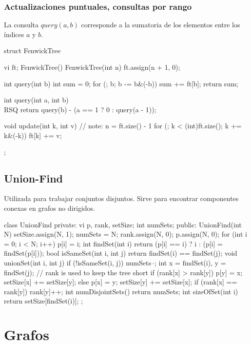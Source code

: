\documentclass[oneside]{book}
\begin{document}
	\subsection{Actualizaciones puntuales, consultas por rango}
	La consulta $query(a,b)$ corresponde a la sumatoria de los elementos entre los \'indices $a$ y $b$. 
	\begin{codigo}
struct FenwickTree {
  vi ft;
  FenwickTree(){}  
  FenwickTree(int n){
    ft.assign(n + 1, 0);
  }

  int query(int b) {
    int sum = 0;
    for (; b; b -= b&(-b)) sum += ft[b];
    return sum;
  }

  int query(int a, int b) { \\RSQ
    return query(b) - (a == 1 ? 0 : query(a - 1));
  }

  void update(int k, int v) {                    // note: n = ft.size() - 1
    for (; k < (int)ft.size(); k += k&(-k)) ft[k] += v;
  }
};
	\end{codigo}
	\section{Union-Find}
	Utilizada para trabajar conjuntos disjuntos. Sirve para encontrar componentes conexas en grafos no dirigidos.   
	\begin{codigo}
class UnionFind {
private:
  vi p, rank, setSize;
  int numSets;
public:
  UnionFind(int N) {
	setSize.assign(N, 1); numSets = N; rank.assign(N, 0);
	p.assign(N, 0); for (int i = 0; i < N; i++) p[i] = i; }
  int findSet(int i) { return (p[i] == i) ? i : (p[i] = findSet(p[i])); }
  bool isSameSet(int i, int j) { return findSet(i) == findSet(j); }
  void unionSet(int i, int j) {  
	if (!isSameSet(i, j)) { numSets--;  
	int x = findSet(i), y = findSet(j);
	// rank is used to keep the tree short
	if (rank[x] > rank[y]) { p[y] = x; setSize[x] += setSize[y]; }
	else               	   { p[x] = y; setSize[y] += setSize[x];
                             if (rank[x] == rank[y]) rank[y]++; } } }
  int numDisjointSets() { return numSets; }
  int sizeOfSet(int i) { return setSize[findSet(i)]; }
};

	\end{codigo}
	
	

	
	\chapter{Grafos}
\end{document}
